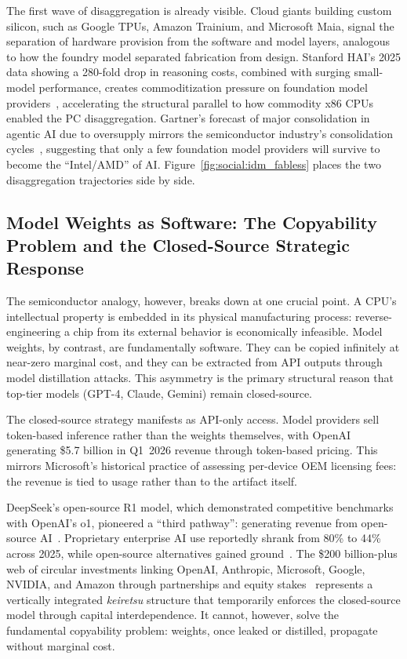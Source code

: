 The first wave of disaggregation is already visible. Cloud giants building custom silicon, such as Google TPUs, Amazon Trainium, and Microsoft Maia, signal the separation of hardware provision from the software and model layers, analogous to how the foundry model separated fabrication from design. Stanford HAI's 2025 data showing a 280-fold drop in reasoning costs, combined with surging small-model performance, creates commoditization pressure on foundation model providers~\cite{stanfordhai2025index}, accelerating the structural parallel to how commodity x86 CPUs enabled the PC disaggregation. Gartner's forecast of major consolidation in agentic AI due to oversupply mirrors the semiconductor industry's consolidation cycles~\cite{gartner2026trends}, suggesting that only a few foundation model providers will survive to become the ``Intel/AMD'' of AI.
Figure~\ref{fig:social:idm_fabless} places the two disaggregation trajectories side by side.


\subsection{Model Weights as Software: The Copyability Problem and the Closed-Source Strategic Response}
\label{sec:copyability}

The semiconductor analogy, however, breaks down at one crucial point. A CPU's intellectual property is embedded in its physical manufacturing process: reverse-engineering a chip from its external behavior is economically infeasible. Model weights, by contrast, are fundamentally software. They can be copied infinitely at near-zero marginal cost, and they can be extracted from API outputs through model distillation attacks. This asymmetry is the primary structural reason that top-tier models (GPT-4, Claude, Gemini) remain closed-source.

The closed-source strategy manifests as API-only access. Model providers sell token-based inference rather than the weights themselves, with OpenAI generating \$5.7 billion in Q1~2026 revenue through token-based pricing. This mirrors Microsoft's historical practice of assessing per-device OEM licensing fees: the revenue is tied to usage rather than to the artifact itself.

DeepSeek's open-source R1 model, which demonstrated competitive benchmarks with OpenAI's o1, pioneered a ``third pathway'': generating revenue from open-source AI~\cite{thirdbridge2025deepseek}. Proprietary enterprise AI use reportedly shrank from 80\% to 44\% across 2025, while open-source alternatives gained ground~\cite{mckinsey2025aisurvey}. The \$200 billion-plus web of circular investments linking OpenAI, Anthropic, Microsoft, Google, NVIDIA, and Amazon through partnerships and equity stakes~\cite{brookings2025aicustomers} represents a vertically integrated \textit{keiretsu} structure that temporarily enforces the closed-source model through capital interdependence. It cannot, however, solve the fundamental copyability problem: weights, once leaked or distilled, propagate without marginal cost.

